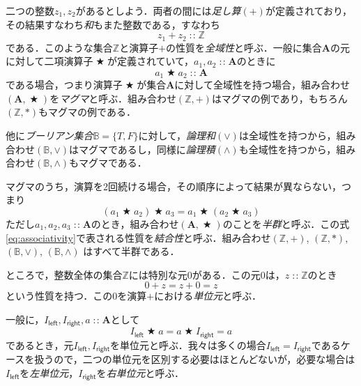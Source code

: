 \documentclass[twocolumn]{jsbook}
\newcommand{\keyword}[1]{{\emph{#1}}}
\newcommand{\mathVarKeyword}[1]{\mathsf{#1}}
\DeclareMathOperator{\mathAnyBinaryOperator}{\bigstar}
\DeclareMathOperator{\mathIn}{:\!:}
\newcommand{\mathLeft}{\mathVarKeyword{left}}
\newcommand{\mathRight}{\mathVarKeyword{right}}
\newcommand{\mathSet}[1]{\mathbf{#1}} %
\newcommand{\mathSpecialSet}[1]{\mathbb{#1}} %
\begin{document}
二つの整数$z_1,z_2$があるとしよう．両者の間には\keyword{足し算}$(+)$が定義されており，その結果すなわち\keyword{和}もまた整数である，すなわち
\begin{equation}
z_1+z_2\mathIn\mathSpecialSet{Z}
\end{equation}
である．このような集合$\mathSpecialSet{Z}$と演算子$+$の性質を\keyword{全域性}と呼ぶ．一般に集合$\mathSet{A}$の元に対して二項演算子$\mathAnyBinaryOperator$が定義されていて，$a_1,a_2\mathIn\mathSet{A}$のときに
\begin{equation}
\label{eq:totality}
a_1\mathAnyBinaryOperator a_2\mathIn\mathSet{A}
\end{equation}
である場合，つまり演算子$\mathAnyBinaryOperator$が集合$\mathSet{A}$に対して全域性を持つ場合，組み合わせ$(\mathSet{A},\mathAnyBinaryOperator)$を\keyword{マグマ}と呼ぶ．組み合わせ$(\mathSpecialSet{Z},+)$はマグマの例であり，もちろん$(\mathSpecialSet{Z},*)$もマグマの例である．

他に\keyword{ブーリアン集合}$\mathSpecialSet{B}=\{T,F\}$に対して，\keyword{論理和}$(\vee)$は全域性を持つから，組み合わせ$(\mathSpecialSet{B},\vee)$はマグマであるし，同様に\keyword{論理積}$(\wedge)$も全域性を持つから，組み合わせ$(\mathSpecialSet{B},\wedge)$もマグマである．

マグマのうち，演算を2回続ける場合，その順序によって結果が異ならない，つまり
\begin{equation}
\label{eq:associativity}
(a_1\mathAnyBinaryOperator a_2)\mathAnyBinaryOperator a_3=a_1\mathAnyBinaryOperator(a_2\mathAnyBinaryOperator a_3)
\end{equation}
ただし$a_1,a_2,a_3\mathIn\mathSet{A}$のとき，組み合わせ$(\mathSet{A},\mathAnyBinaryOperator)$のことを\keyword{半群}と呼ぶ．この式\eqref{eq:associativity}で表される性質を\keyword{結合性}と呼ぶ．組み合わせ$(\mathSpecialSet{Z},+)$, $(\mathSpecialSet{Z},*)$, $(\mathSpecialSet{B},\vee)$, $(\mathSpecialSet{B},\wedge)$ はすべて半群である．

ところで，整数全体の集合$\mathSpecialSet{Z}$には特別な元$0$がある．この元$0$は，$z\mathIn\mathSpecialSet{Z}$のとき
\begin{equation}
0+z=z+0=z
\end{equation}
という性質を持つ．この$0$を演算$+$における\keyword{単位元}と呼ぶ．

一般に，$I_\mathLeft,I_\mathRight,a\mathIn\mathSet{A}$として
\begin{equation}
\label{eq:identity}
I_\mathLeft\mathAnyBinaryOperator a=a\mathAnyBinaryOperator I_\mathRight=a
\end{equation}
であるとき，元$I_\mathLeft,I_\mathRight$を単位元と呼ぶ．我々は多くの場合$I_\mathLeft=I_\mathRight$であるケースを扱うので，二つの単位元を区別する必要はほとんどないが，必要な場合は$I_\mathLeft$を\keyword{左単位元}，$I_\mathRight$を\keyword{右単位元}と呼ぶ．
\end{document}
